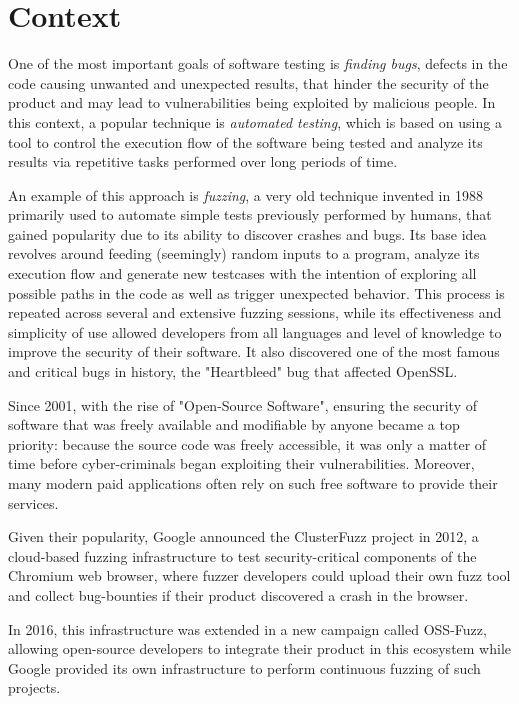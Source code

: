 \section{Context}
One of the most important goals of software testing is \textit{finding bugs}, defects in the code causing unwanted and unexpected results, that hinder the security of the product and may lead to vulnerabilities being exploited by malicious people. In this context, a popular technique is \textit{automated testing}, which is based on using a tool to control the execution flow of the software being tested and analyze its results via repetitive tasks performed over long periods of time. 

An example of this approach is \textit{fuzzing}, a very old technique invented in 1988 primarily used to automate simple tests previously performed by humans, that gained popularity due to its ability to discover crashes and bugs. Its base idea revolves around feeding (seemingly) random inputs to a program, analyze its execution flow and generate new testcases with the intention of exploring all possible paths in the code as well as trigger unexpected behavior. This process is repeated across several and extensive fuzzing sessions, while its effectiveness and simplicity of use allowed developers from all languages and level of knowledge to improve the security of their software. It also discovered one of the most famous and critical bugs in history, the "Heartbleed" bug that affected OpenSSL.

Since 2001, with the rise of "Open-Source Software", ensuring the security of software that was freely available and modifiable by anyone became a top priority: because the source code was freely accessible, it was only a matter of time before cyber-criminals began exploiting their vulnerabilities. Moreover, many modern paid applications often rely on such free software to provide their services. 

Given their popularity, Google announced the ClusterFuzz project in 2012, a cloud-based fuzzing infrastructure to test security-critical components of the Chromium web browser, where fuzzer developers could upload their own fuzz tool and collect bug-bounties if their product discovered a crash in the browser.

In 2016, this infrastructure was extended in a new campaign called OSS-Fuzz, allowing open-source developers to integrate their product in this ecosystem while Google provided its own infrastructure to perform continuous fuzzing of such projects.

